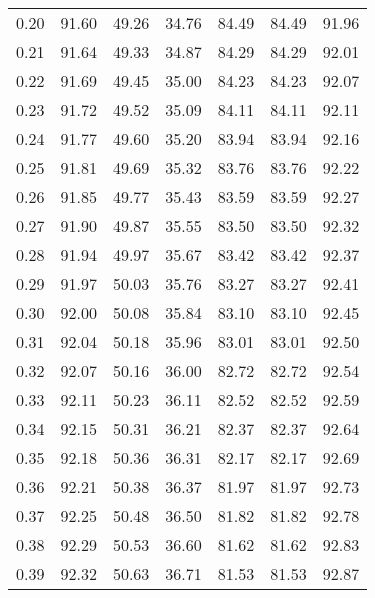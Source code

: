 \begin{tabular}{|c|c|c|c|c|c|c|}
      0.20 &     91.60 &     49.26 &      34.76 &   84.49 &      84.49 &         91.96 \\
      0.21 &     91.64 &     49.33 &      34.87 &   84.29 &      84.29 &         92.01 \\
      0.22 &     91.69 &     49.45 &      35.00 &   84.23 &      84.23 &         92.07 \\
      0.23 &     91.72 &     49.52 &      35.09 &   84.11 &      84.11 &         92.11 \\
      0.24 &     91.77 &     49.60 &      35.20 &   83.94 &      83.94 &         92.16 \\
      0.25 &     91.81 &     49.69 &      35.32 &   83.76 &      83.76 &         92.22 \\
      0.26 &     91.85 &     49.77 &      35.43 &   83.59 &      83.59 &         92.27 \\
      0.27 &     91.90 &     49.87 &      35.55 &   83.50 &      83.50 &         92.32 \\
      0.28 &     91.94 &     49.97 &      35.67 &   83.42 &      83.42 &         92.37 \\
      0.29 &     91.97 &     50.03 &      35.76 &   83.27 &      83.27 &         92.41 \\
      0.30 &     92.00 &     50.08 &      35.84 &   83.10 &      83.10 &         92.45 \\
      0.31 &     92.04 &     50.18 &      35.96 &   83.01 &      83.01 &         92.50 \\
      0.32 &     92.07 &     50.16 &      36.00 &   82.72 &      82.72 &         92.54 \\
      0.33 &     92.11 &     50.23 &      36.11 &   82.52 &      82.52 &         92.59 \\
      0.34 &     92.15 &     50.31 &      36.21 &   82.37 &      82.37 &         92.64 \\
      0.35 &     92.18 &     50.36 &      36.31 &   82.17 &      82.17 &         92.69 \\
      0.36 &     92.21 &     50.38 &      36.37 &   81.97 &      81.97 &         92.73 \\
      0.37 &     92.25 &     50.48 &      36.50 &   81.82 &      81.82 &         92.78 \\
      0.38 &     92.29 &     50.53 &      36.60 &   81.62 &      81.62 &         92.83 \\
      0.39 &     92.32 &     50.63 &      36.71 &   81.53 &      81.53 &         92.87 \\

\end{tabular}
